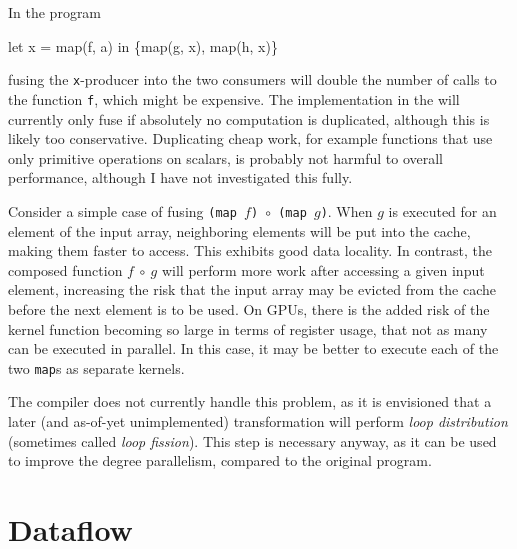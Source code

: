 \begin{description}[style=nextline]
\item[Computation may be duplicated.]

In the program
\begin{colorcode}
let x = map(f, a) in
\{map(g, x), map(h, x)\}
\end{colorcode}
fusing the \texttt{x}-producer into the two consumers will double the
number of calls to the function \texttt{f}, which might be expensive.
The implementation in the \LO{} will currently only fuse if absolutely
no computation is duplicated, although this is likely too
conservative.  Duplicating cheap work, for example functions that use
only primitive operations on scalars, is probably not harmful to
overall performance, although I have not investigated this
fully.

\item[Can reduce memory locality.]

  Consider a simple case of fusing
  \texttt{(map~$f$)~$\circ$~(map~$g$)}.  When $g$ is executed for an
  element of the input array, neighboring elements will be put into
  the cache, making them faster to access.  This exhibits good data
  locality.  In contrast, the composed function $f~\circ~g$ will
  perform more work after accessing a given input element, increasing
  the risk that the input array may be evicted from the cache before
  the next element is to be used.  On GPUs, there is the added risk of
  the kernel function becoming so large in terms of register usage,
  that not as many can be executed in parallel.  In this case, it may
  be better to execute each of the two \texttt{map}s as separate
  kernels.

  The \LO{} compiler does not currently handle this problem, as it is
  envisioned that a later (and as-of-yet unimplemented) transformation
  will perform \textit{loop distribution} (sometimes called
  \textit{loop fission}).  This step is necessary anyway, as it can be
  used to improve the degree parallelism, compared to the original
  program.
\end{description}

\section{Dataflow}

\newcommand{\unfusable}[0]{\textsc{unfusable}}
\newcommand{\inputs}[0]{\textsc{arrInputs}}
\newcommand{\soacs}[0]{\textsc{SOACs}}
\newcommand{\patNames}[1]{\textsc{patNames}(#1)}
\newcommand{\childExps}[1]{\textsc{childExps}(#1)}
\newcommand{\parentExp}[1]{\textsc{parentExp}(#1)}

